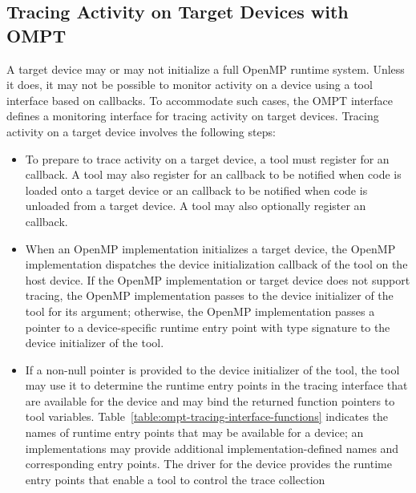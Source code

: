 \subsection{Tracing Activity on Target Devices with OMPT}
\label{sec:tracing-device-activity}

A target device may or may not initialize a full OpenMP runtime system.
Unless it does, it may not be possible to monitor activity on a device 
using a tool interface based on callbacks. To accommodate such cases, 
the OMPT interface defines a monitoring interface for tracing activity 
on target devices. Tracing activity on a target device involves the 
following steps:

\begin{itemize}
\item To prepare to trace activity on a target device, a tool must 
      register for an  callback.  
      A tool may also register for an  
      callback to be notified when code is loaded onto a target device 
      or an  callback to be notified 
      when code is unloaded from a target device. A tool may also 
      optionally register an  callback.
\item When an OpenMP implementation initializes a target device, the
      OpenMP implementation dispatches the device initialization callback 
      of the tool on the host device. If the OpenMP implementation or target 
      device does not support tracing, the OpenMP implementation passes
       to the device initializer of the tool for its  
      argument; otherwise, the OpenMP implementation passes a pointer 
      to a device-specific runtime entry point with type signature 
       to the device initializer of the tool.
\item If a non-null  pointer is provided to the device initializer 
      of the tool, the tool may use it to determine the runtime entry points in 
      the tracing interface that are available for the device and may bind the 
      returned function pointers to tool variables. 
      Table~\ref{table:ompt-tracing-interface-functions} indicates the
      names of runtime entry points that may be available for a device; an
      implementations may provide additional implementation-defined names and 
      corresponding entry points. The driver for the device provides the
      runtime entry points that enable a tool to control the trace collection

\end{itemize}
